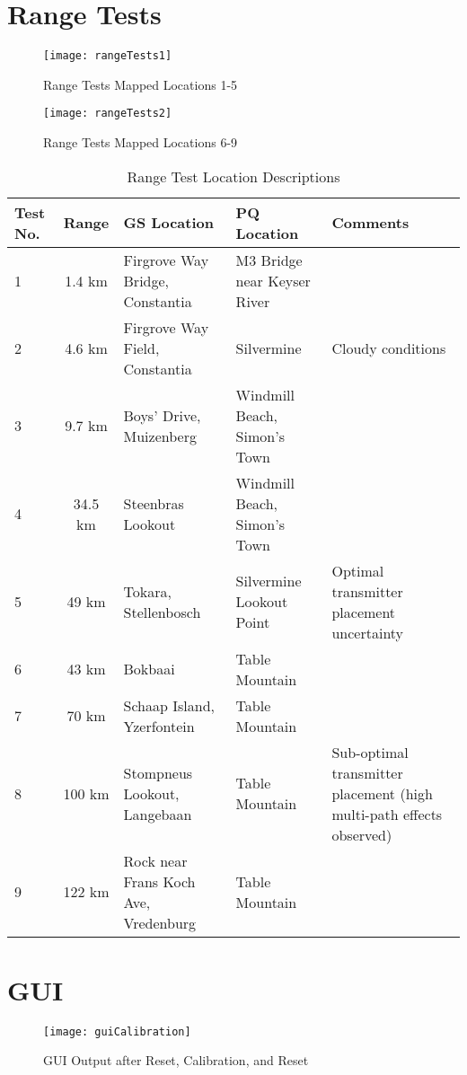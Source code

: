 \section{Range Tests}\label{sec:appendix_range}
\begin{figure}[!htb]
  \centering
  \texttt{[image: rangeTests1]}
  \caption{Range Tests Mapped Locations 1-5}
  \label{fig:rangeTests1}
\end{figure}
\begin{figure}[!htb]
  \centering
  \texttt{[image: rangeTests2]}
  \caption{Range Tests Mapped Locations 6-9}
  \label{fig:rangeTests2}
\end{figure}
\begin{table}[!htb]
  \centering
  \renewcommand{\arraystretch}{1.2}
  \begin{tabular}{ |p{1cm}|c|p{4cm}|p{4cm}|p{3cm}| }
  \hline
  \textbf{Test No.}         & \textbf{Range}        & \textbf{GS Location}      & \textbf{PQ Location}      & \textbf{Comments} \\ 
  \hline
  1                         
  & 1.4 km  
  & Firgrove Way Bridge, Constantia
  & M3 Bridge near Keyser River
  & \\ \hline
  2
  & 4.6 km  
  & Firgrove Way Field, Constantia
  & Silvermine
  & Cloudy conditions \\ \hline
  3
  & 9.7 km  
  & Boys' Drive, Muizenberg
  & Windmill Beach, Simon's Town
  & \\ \hline
  4
  & 34.5 km  
  & Steenbras Lookout
  & Windmill Beach, Simon's Town
  & \\ \hline
  5
  & 49 km  
  & Tokara, Stellenbosch  
  & Silvermine Lookout Point
  & Optimal transmitter placement uncertainty \\ \hline
  6
  & 43 km  
  & Bokbaai
  & Table Mountain
  & \\ \hline
  7
  & 70 km  
  & Schaap Island, Yzerfontein
  & Table Mountain
  & \\ \hline
  8
  & 100 km  
  & Stompneus Lookout, Langebaan
  & Table Mountain
  & Sub-optimal transmitter placement (high multi-path effects observed) \\ \hline
  9
  & 122 km  
  & Rock near Frans Koch Ave, Vredenburg
  & Table Mountain
  & \\ \hline
  \end{tabular}
  \caption{Range Test Location Descriptions}
  \label{tab:rangeTestLocations}
\end{table}

\clearpage
\section{GUI}
\begin{figure}[!htb]
  \centering
  \texttt{[image: guiCalibration]}
  \caption{GUI Output after Reset, Calibration, and Reset}
  \label{fig:guiCalibration}
\end{figure}